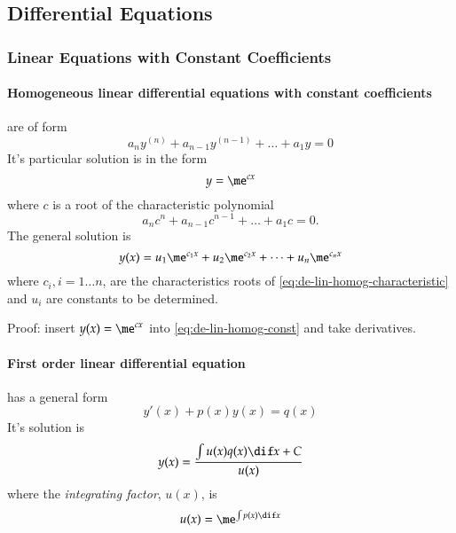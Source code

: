 \documentclass[a4paper]{article}
\numberwithin{equation}{subsection}
\begin{document}
\subsection{Differential Equations}
\label{differential-equations}

\subsubsection{Linear Equations with Constant Coefficients}
\label{sec:linear-constant}

\paragraph{Homogeneous linear differential equations with constant
  coefficients}
are of form
\begin{equation}
  \label{eq:de-lin-homog-const}
  a_{n} y^{(n)} + a_{n-1} y^{(n-1)} + \dots + a_{1} y = 0
\end{equation}
It's  particular solution is in the form
\begin{equation}
  y = \me^{c x}
\end{equation}
where $c$ is a root of the characteristic polynomial
\begin{equation}
  \label{eq:de-lin-homog-characteristic}
  a_{n} c^{n} + a_{n-1} c^{n-1} + \dots + a_{1} c = 0.
\end{equation}
The general solution is
\begin{equation}
  \label{eq:de-lin-homog-general}
  y(x) = u_{1} \me^{c_{1} x} + u_{2} \me^{c_{2} x} + \dots + u_{n} \me^{c_{n}x}
\end{equation}
where $c_{i}, i=1\dots n$, are the characteristics roots of
\eqref{eq:de-lin-homog-characteristic} and $u_{i}$ are constants to be
determined. 

Proof: insert $y(x) = \me^{cx}$ into \eqref{eq:de-lin-homog-const} and
take derivatives.


\paragraph{First order linear differential equation}
has a general form
\begin{equation}
  \label{eq:de-1st-lin-general}
  y'(x) + p(x) y(x) = q(x)
\end{equation}
It's solution is
\begin{equation}
  \label{eq:de-1st-lin-solution}
  y(x) =
  \frac{\int u(x) q(x) \dif x + C}{u(x)}
\end{equation}
where the \emph{integrating factor}, $u(x)$, is
\begin{equation}
  \label{eq:de-1st-lin-if}
  u(x) = \me^{\int p(x) \dif x}
\end{equation}
\end{document}
